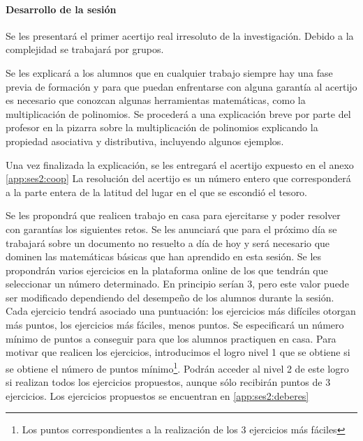 \paragraph{Desarrollo de la sesión}

Se les presentará el primer acertijo real irresoluto de la investigación.
%
Debido a la complejidad se trabajará por grupos.

Se les explicará a los alumnos que en cualquier trabajo siempre hay una fase previa de formación y para que puedan enfrentarse con alguna garantía al acertijo es necesario que conozcan algunas herramientas matemáticas, como la multiplicación de polinomios.
%
Se procederá a una explicación breve por parte del profesor en la pizarra sobre la multiplicación de polinomios explicando la propiedad asociativa y distributiva, incluyendo algunos ejemplos.

Una vez finalizada la explicación, se les entregará el acertijo expuesto en el anexo \ref{app:ses2:coop}
%
La resolución del acertijo es un número entero que corresponderá a la parte entera de la latitud del lugar en el que se escondió el tesoro.



Se les propondrá que realicen trabajo en casa para ejercitarse y poder resolver con garantías los siguientes retos.
%
Se les anunciará que para el próximo día se trabajará sobre un documento no resuelto a día de hoy y será necesario que dominen las matemáticas básicas que han aprendido en esta sesión.
%
Se les propondrán varios ejercicios en la plataforma online de los que tendrán que seleccionar un número determinado. 
%
En principio serían 3, pero este valor puede ser modificado dependiendo del desempeño de los alumnos durante la sesión.
%
Cada ejercicio tendrá asociado una puntuación: los ejercicios más difíciles otorgan más puntos, los ejercicios más fáciles, menos puntos.
%
Se especificará un número mínimo de puntos a conseguir para que los alumnos practiquen en casa. 
%
Para motivar que realicen los ejercicios, introducimos el logro  nivel 1 que se obtiene si se obtiene el número de puntos mínimo\footnote{Los puntos correspondientes a la realización de los 3 ejercicios más fáciles}.
%
Podrán acceder al nivel 2 de este logro si realizan todos los ejercicios propuestos, aunque sólo recibirán puntos de 3 ejercicios.
%
Los ejercicios propuestos se encuentran en \ref{app:ses2:deberes}

